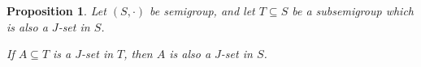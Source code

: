 \documentclass[12pt]{article}
\theoremstyle{plain}
\newtheorem{prop}[thm]{Proposition}
\theoremstyle{definition}
\begin{document}
\begin{prop}
  Let $(S, \cdot)$ be  semigroup, and let $T \subseteq S$ be a
  subsemigroup which is also a $J$-set in $S$.

  If $A \subseteq T$ is a $J$-set in $T$, then $A$ is also a $J$-set
  in $S$.
\end{prop}




\end{document}
